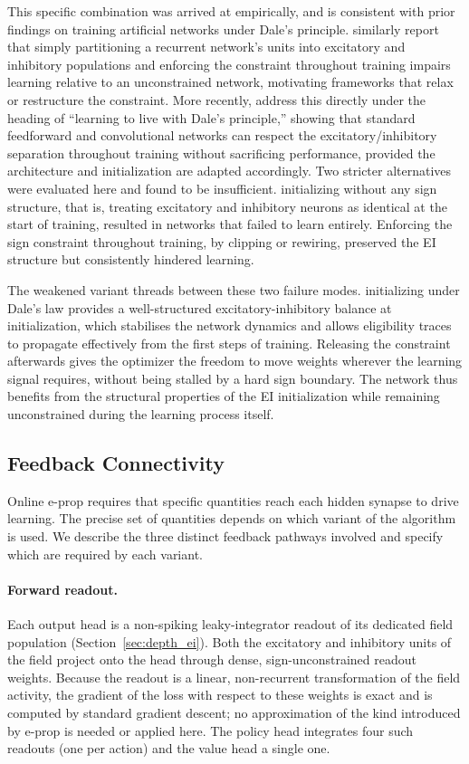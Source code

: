 This specific combination was arrived at empirically, and is consistent
with prior findings on training artificial networks under Dale's
principle. \citep{Song2016DaleEI} similarly report that simply
partitioning a recurrent network's units into excitatory and inhibitory
populations and enforcing the constraint throughout training impairs
learning relative to an unconstrained network, motivating frameworks that
relax or restructure the constraint.
More recently, \citep{Cornford2021DaleANN} address this
directly under the heading of ``learning to live with Dale's principle,''
showing that standard feedforward and convolutional networks can respect
the excitatory/inhibitory separation throughout training without
sacrificing performance, provided the architecture and initialization are
adapted accordingly. Two stricter alternatives were evaluated
here and found to be insufficient. initializing without any sign
structure, that is, treating excitatory and inhibitory neurons as
identical at the start of training, resulted in networks that failed to
learn entirely. Enforcing the sign constraint throughout training, by
clipping or rewiring, preserved the EI
structure but consistently hindered learning.

The weakened variant threads between these two failure modes. initializing under
Dale's law provides a well-structured excitatory-inhibitory balance at initialization, which stabilises the network dynamics and allows eligibility
traces to propagate effectively from the first steps of training. Releasing the
constraint afterwards gives the optimizer the freedom to move weights wherever the
learning signal requires, without being stalled by a hard sign boundary. The network
thus benefits from the structural properties of the EI initialization while remaining
unconstrained during the learning process itself.

\subsection{Feedback Connectivity}
\label{sec:feedback_connectivity}

Online e-prop requires that specific quantities reach each hidden synapse to drive
learning. The precise set of quantities depends on which variant of the algorithm is
used. We describe the three distinct feedback pathways involved and specify which are
required by each variant.

\paragraph{Forward readout.}
Each output head is a non-spiking leaky-integrator readout of its dedicated field
population (Section~\ref{sec:depth_ei}). Both the excitatory and inhibitory units of
the field project onto the head through dense, sign-unconstrained readout weights.
Because the readout is a linear, non-recurrent transformation of the field activity,
the gradient of the loss with respect to these weights is exact and is computed by
standard gradient descent; no approximation of the kind introduced by e-prop is
needed or applied here. The policy head integrates four such readouts (one per action)
and the value head a single one.

